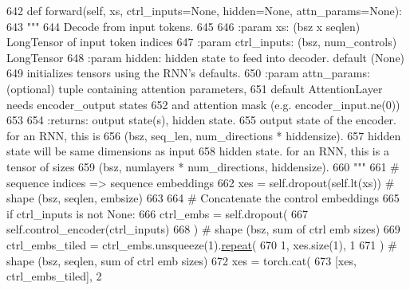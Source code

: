 \begin{DoxyCode}
642     \textcolor{keyword}{def }forward(self, xs, ctrl\_inputs=None, hidden=None, attn\_params=None):
643         \textcolor{stringliteral}{"""}
644 \textcolor{stringliteral}{        Decode from input tokens.}
645 \textcolor{stringliteral}{}
646 \textcolor{stringliteral}{        :param xs:          (bsz x seqlen) LongTensor of input token indices}
647 \textcolor{stringliteral}{        :param ctrl\_inputs: (bsz, num\_controls) LongTensor}
648 \textcolor{stringliteral}{        :param hidden:      hidden state to feed into decoder. default (None)}
649 \textcolor{stringliteral}{                            initializes tensors using the RNN's defaults.}
650 \textcolor{stringliteral}{        :param attn\_params: (optional) tuple containing attention parameters,}
651 \textcolor{stringliteral}{                            default AttentionLayer needs encoder\_output states}
652 \textcolor{stringliteral}{                            and attention mask (e.g. encoder\_input.ne(0))}
653 \textcolor{stringliteral}{}
654 \textcolor{stringliteral}{        :returns:           output state(s), hidden state.}
655 \textcolor{stringliteral}{                            output state of the encoder. for an RNN, this is}
656 \textcolor{stringliteral}{                            (bsz, seq\_len, num\_directions * hiddensize).}
657 \textcolor{stringliteral}{                            hidden state will be same dimensions as input}
658 \textcolor{stringliteral}{                            hidden state. for an RNN, this is a tensor of sizes}
659 \textcolor{stringliteral}{                            (bsz, numlayers * num\_directions, hiddensize).}
660 \textcolor{stringliteral}{        """}
661         \textcolor{comment}{# sequence indices => sequence embeddings}
662         xes = self.dropout(self.lt(xs))  \textcolor{comment}{# shape (bsz, seqlen, embsize)}
663 
664         \textcolor{comment}{# Concatenate the control embeddings}
665         \textcolor{keywordflow}{if} ctrl\_inputs \textcolor{keywordflow}{is} \textcolor{keywordflow}{not} \textcolor{keywordtype}{None}:
666             ctrl\_embs = self.dropout(
667                 self.control\_encoder(ctrl\_inputs)
668             )  \textcolor{comment}{# shape (bsz, sum of ctrl emb sizes)}
669             ctrl\_embs\_tiled = ctrl\_embs.unsqueeze(1).\hyperlink{namespacerepeat}{repeat}(
670                 1, xes.size(1), 1
671             )  \textcolor{comment}{# shape (bsz, seqlen, sum of ctrl emb sizes)}
672             xes = torch.cat(
673                 [xes, ctrl\_embs\_tiled], 2

\end{DoxyCode}
